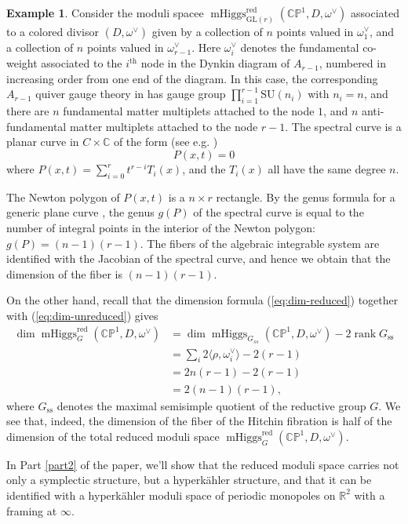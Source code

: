 \documentclass[11pt, oneside, reqno]{amsart}
\theoremstyle{definition} \newtheorem{definition}{Definition}[section]
\theoremstyle{definition} \newtheorem{remark}[definition]{Remark}
\theoremstyle{definition} \newtheorem{remarks}[definition]{Remarks}
\theoremstyle{definition} \newtheorem{question}[definition]{Question}
\theoremstyle{definition} \newtheorem*{note}{Note}
\theoremstyle{definition} \newtheorem{example}[definition]{Example}
\theoremstyle{definition} \newtheorem{examples}[definition]{Examples}
\newcommand{\bb}[1]{\mathbb{#1}}
\newcommand{\mr}[1]{\mathrm{#1}}
\newcommand{\RR}{\mathbb{R}}
\newcommand{\GL}{\mathrm{GL}}
\newcommand{\SU}{\mathrm{SU}}
\DeclareMathOperator{\rank}{rank}
\DeclareMathOperator{\mhiggs}{mHiggs}
\newcommand{\red}{\mathrm{red}}
\begin{document}
\begin{example}
Consider the moduli spacee $\mhiggs^\red_{\GL(r)}(\bb{CP}^1, D, \omega^\vee)$ associated to a colored divisor $(D, \omega^\vee)$
given by a collection of $n$ points valued in $\omega_1^{\vee}$, and a collection of $n$ points valued in $\omega_{r-1}^{\vee}$.  Here $\omega_i^{\vee}$ denotes the fundamental co-weight associated to the $i^\mr{th}$ node in the Dynkin diagram of $A_{r-1}$, numbered in increasing order from one end of the diagram. In this case, the corresponding $A_{r-1}$ quiver gauge theory in \cite{NekrasovPestun} has gauge group $\prod_{i=1}^{r-1} \SU(n_i)$ with $n_i = n$, and there are $n$ fundamental matter multiplets attached to the node $1$, and $n$ anti-fundamental matter multiplets attached to the node $r-1$. The spectral curve is a planar curve in $C \times \mathbb{C}$ of the form (see e.g. \cite{NekrasovPestun})
\[P(x,t) = 0\]
where $P(x,t) = \sum_{i=0}^{r} t^{r-i} T_{i}(x)$, and the $T_i(x)$ all have the same degree $n$.

The Newton polygon of $P(x,t)$ is a $n \times r$ rectangle. By the genus formula for a generic plane curve \cite{Baker, Khovanskii}, the genus $g(P)$ of the spectral curve is equal to the number of integral points in the interior of the Newton polygon: $g(P) = (n-1)(r-1)$. The fibers of the algebraic integrable system are identified with the Jacobian of the spectral curve, and hence we obtain that
the dimension of the fiber is $(n-1)(r-1)$.

On the other hand, recall that the dimension formula (\ref{eq:dim-reduced}) together with (\ref{eq:dim-unreduced}) gives
\begin{align*}
  \dim \mhiggs^\red_G(\bb{CP}^1, D, \omega^\vee) &=  \dim \mhiggs_{G_{ss}}(\bb{CP}^1, D, \omega^\vee) - 2 \rank G_{\mr{ss}} \\
  &= \sum_{i} 2 \langle \rho, \omega_i^{\vee} \rangle  - 2 (r-1)  \\
  &= 2 n (r - 1)  - 2(r - 1) \\ 
  &= 2(n-1)(r-1),
\end{align*}
where $G_{\mr{ss}}$ denotes the maximal semisimple quotient of the reductive group $G$. We see that, indeed, the dimension of the fiber of the Hitchin fibration is half of the dimension of the total reduced moduli space $\mhiggs^{\red}_{G}(\bb{CP}^1, D, \omega^\vee)$. 
\end{example}

In Part \ref{part2} of the paper, we'll show that the reduced moduli space carries not only a symplectic structure, but a hyperk\"ahler structure, and that it can be identified with a hyperk\"ahler moduli space of periodic monopoles on $\RR^2$ with a framing at $\infty$.
\end{document}
